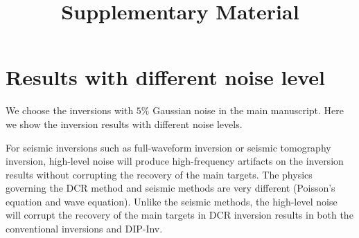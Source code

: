 \documentclass{article}
\title{Supplementary Material}
\date{}
\begin{document}
\maketitle





\section{Results with different noise level}

We choose the inversions with $5\%$ Gaussian noise in the main manuscript. Here we show the inversion results with different noise levels.

For seismic inversions such as full-waveform inversion or seismic tomography inversion, high-level noise will produce high-frequency artifacts on the inversion results without corrupting the recovery of the main targets. The physics governing the DCR method and seismic methods are very different (Poisson’s equation and wave equation). Unlike the seismic methods, the high-level noise will corrupt the recovery of the main targets in DCR inversion results in both the conventional inversions and DIP-Inv. 
\end{document}
